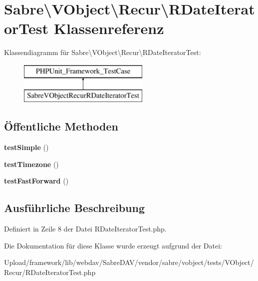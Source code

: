 \hypertarget{class_sabre_1_1_v_object_1_1_recur_1_1_r_date_iterator_test}{}\section{Sabre\textbackslash{}V\+Object\textbackslash{}Recur\textbackslash{}R\+Date\+Iterator\+Test Klassenreferenz}
\label{class_sabre_1_1_v_object_1_1_recur_1_1_r_date_iterator_test}
Klassendiagramm für Sabre\textbackslash{}V\+Object\textbackslash{}Recur\textbackslash{}R\+Date\+Iterator\+Test\+:\begin{figure}[H]
\begin{center}
\leavevmode
\includegraphics[height=2.000000cm]{class_sabre_1_1_v_object_1_1_recur_1_1_r_date_iterator_test}
\end{center}
\end{figure}
\subsection*{Öffentliche Methoden}
\begin{DoxyCompactItemize}
\item 
\mbox{\label{class_sabre_1_1_v_object_1_1_recur_1_1_r_date_iterator_test_aea316536df993e5f21310ec12a714479}} 
{\bfseries test\+Simple} ()
\item 
\mbox{\label{class_sabre_1_1_v_object_1_1_recur_1_1_r_date_iterator_test_a2a373548f34e8422ab299a0d29e76766}} 
{\bfseries test\+Timezone} ()
\item 
\mbox{\label{class_sabre_1_1_v_object_1_1_recur_1_1_r_date_iterator_test_af6f76cffca9f836179bcf8eb802dc227}} 
{\bfseries test\+Fast\+Forward} ()
\end{DoxyCompactItemize}


\subsection{Ausführliche Beschreibung}


Definiert in Zeile 8 der Datei R\+Date\+Iterator\+Test.\+php.



Die Dokumentation für diese Klasse wurde erzeugt aufgrund der Datei\+:\begin{DoxyCompactItemize}
\item 
Upload/framework/lib/webdav/\+Sabre\+D\+A\+V/vendor/sabre/vobject/tests/\+V\+Object/\+Recur/R\+Date\+Iterator\+Test.\+php\end{DoxyCompactItemize}
